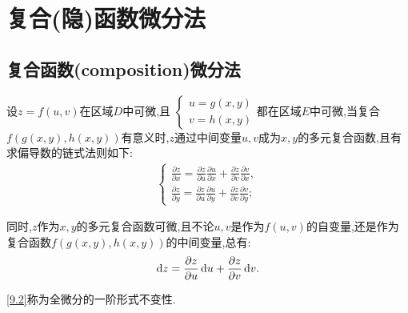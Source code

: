 
\setcounter{chapter}{8} %

\chapter{复合(隐)函数微分法}

\section{复合函数(composition)微分法}

\begin{theorem}
    设$z=f(u,v)$在区域$D$中可微,且
    $\begin{cases}
        u=g(x,y)\\
        v=h(x,y)
    \end{cases}$都在区域$E$中可微,当复合$f(g(x,y),h(x,y))$有意义时,$z$通过中间变量$u,v$成为$x,y$的多元复合函数,且有求偏导数的链式法则如下:
    \begin{align}
        \begin{cases}
            \frac{\partial z}{\partial x}=\frac{\partial z}{\partial u}\frac{\partial u}{\partial x}+\frac{\partial z}{\partial v}\frac{\partial v}{\partial x},\\
            \frac{\partial z}{\partial y}=\frac{\partial z}{\partial u}\frac{\partial u}{\partial y}+\frac{\partial z}{\partial v}\frac{\partial v}{\partial y};\label{9.1}
        \end{cases}
    \end{align}

    同时,$z$作为$x,y$的多元复合函数可微,且不论$u,v$是作为$f(u,v)$的自变量,还是作为复合函数$f(g(x,y),h(x,y))$的中间变量,总有:
    \begin{align}
        \operatorname{d\!}{}z=\frac{\partial z}{\partial u}\operatorname{d\!}{}u+\frac{\partial z}{\partial v}\operatorname{d\!}{}v.\label{9.2}
    \end{align}

    \ref{9.2}称为全微分的一阶形式不变性.
\end{theorem}

